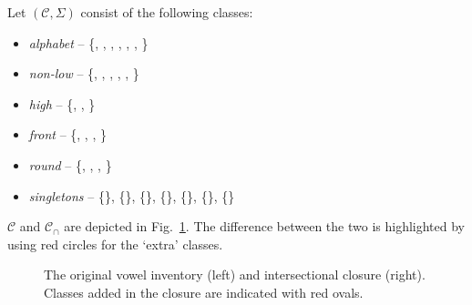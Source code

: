 \documentclass[11pt, oneside]{article}   	%
\begin{document}
\vspace{\baselineskip} \noindent Let $(\mathcal C, \Sigma)$ consist of the following classes: \begin{itemize}
  \item \textit{alphabet} -- \{, , , , \textipa{\oe}, , \} 
  \item \textit{non-low} -- \{, , , , \textipa{\oe}, \} 
  \item \textit{high} -- \{, , \}
  \item \textit{front} -- \{, , , \textipa{\oe}\}
  \item \textit{round} -- \{, , \textipa{\oe}, \}
  \item \textit{singletons} -- \{\}, \{\}, \{\}, \{\}, \{\textipa{\oe}\}, \{\}, \{\}
  \end{itemize}

\vspace{\baselineskip} \noindent $\mathcal C$ and $\mathcal C_\cap$ are depicted in Fig.~\ref{fig:vowel_inventory}. The difference between the two is highlighted by using red circles for the `extra' classes.

\begin{figure}[h]
  \centering
  \qquad
  \caption{The original vowel inventory (left) and intersectional closure (right). Classes added in the closure are indicated with red ovals.}
  \label{fig:vowel_inventory}
\end{figure}
\end{document}
